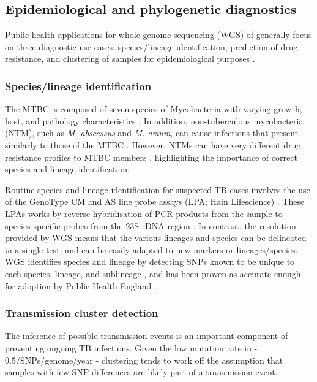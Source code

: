 \subsection{Epidemiological and phylogenetic diagnostics}
Public health applications for whole genome sequencing (WGS) of \mtb{} generally focus on three diagnostic use-cases: species/lineage identification, prediction of drug resistance, and clustering of samples for epidemiological purposes \cite{Gordon2021,Meehan2019}.

\subsubsection{Species/lineage identification}
The MTBC is composed of seven species of Mycobacteria with varying growth, host, and pathology characteristics \cite{Homolka2012}. In addition, non-tuberculous mycobacteria (NTM), such as \textit{M. abscessus} and \textit{M. avium}, can cause infections that present similarly to those of the MTBC \cite{Johansen2020}. However, NTMs can have very different drug resistance profiles to MTBC members \cite{Floto2016,Johansen2020}, highlighting the importance of correct species and lineage identification.

Routine species and lineage identification for suspected TB cases involves the use of the GenoType CM and AS line probe assays (LPA; Hain Lifescience) \cite{Makinen2006,Quan2018}. These LPAs works by reverse hybridisation of PCR products from the sample to species-specific probes from the 23S rDNA region \cite{Makinen2006}. In contrast, the resolution provided by WGS means that the various lineages and species can be delineated in a single test, and can be easily adapted to new markers or lineages/species. WGS identifies species and lineage by detecting SNPs known to be unique to each species, lineage, and sublineage \cite{Coll2014,Homolka2012,Stucki2016standard,Lipworth2019}, and has been proven as accurate enough for adoption by Public Health England \cite{Quan2018}.

\subsubsection{Transmission cluster detection}
The inference of possible transmission events is an important component of preventing ongoing TB infections. Given the low mutation rate in \mtb{} - 0.5/SNPs/genome/year \cite{walker2013} - clustering tends to work off the assumption that samples with few SNP differences are likely part of a transmission event. 

